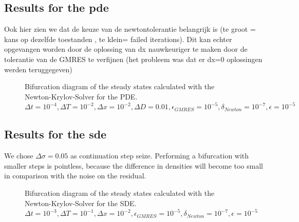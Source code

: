 \documentclass[]{article}
\theoremstyle{definition}
\begin{document}
\subsection{Results for the pde}
Ook hier zien we dat de keuze van de newtontolerantie belangrijk is (te groot = kans op dezelfde toestanden , te klein= failed iterations).
Dit kan echter opgevangen worden door de oplossing van dx nauwkeuriger te maken door de tolerantie van de GMRES te verfijnen (het probleem was dat er dx=0 oplossingen werden teruggegeven) 

\begin{figure}
\caption{  Bifurcation diagram of the steady states calculated with the Newton-Krylov-Solver for the PDE. $\Delta t = 10^{-4}, \Delta T = 10^{-2}, \Delta x = 10^{-2}, \Delta D = 0.01, \epsilon_{GMRES}=10^{-5},  \delta_{Newton} = 10^{-7}, \epsilon=10^{-5}$
}
\end{figure}

\subsection{Results for the sde}
We chose $\Delta \sigma = 0.05$ as continuation step seize. Performing a bifurcation with smaller steps is pointless, because the difference in densities will become too small in comparison with the noise on the residual.

\begin{figure}
\caption{  Bifurcation diagram of the steady states calculated with the Newton-Krylov-Solver for the SDE. $\Delta t = 10^{-3}, \Delta T = 10^{-1}, \Delta x = 10^{-2}, \epsilon_{GMRES}=10^{-5},  \delta_{Newton} = 10^{-7}, \epsilon=10^{-5}$
}
\end{figure}

\end{document}
